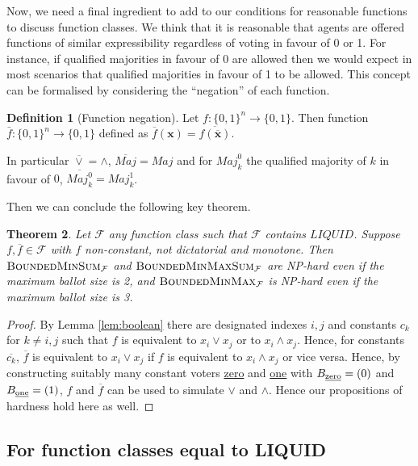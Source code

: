 \documentclass[11pt,a4paper, titlepage]{article}
\newtheorem{theorem}{Theorem}[section]
\theoremstyle{definition}
\newtheorem{definition}[theorem]{Definition}
\let\vec\mathbf
\newcommand{\BMM}{\textsc{BoundedMinMax}}
\newcommand{\BMS}{\textsc{BoundedMinSum}}
\newcommand{\BMMS}{\textsc{BoundedMinMaxSum}}
\newcommand{\Maj}{\mathit{Maj}}
\newcommand{\LIQUID}{\mathit{LIQUID}}
\begin{document}
Now, we need a final ingredient to add to our conditions for reasonable functions to discuss function classes.
We think that it is reasonable that agents are offered functions of similar expressibility regardless of voting in favour of 0 or 1.
For instance, if qualified majorities in favour of 0 are allowed then we would expect in most scenarios that qualified majorities in favour of 1 to be allowed.
This concept can be formalised by considering the ``negation'' of each function.

\begin{definition}[Function negation]
    Let $f \colon \{0, 1\}^n \longrightarrow \{0, 1\}$. Then function $\bar{f} \colon \{0, 1\}^n \longrightarrow \{0, 1\}$ defined as $\overline{f}(\vec{x}) = \overline{f(\overline{\vec{x}})}$.
\end{definition}

In particular $\overline{\lor} = \land$, $\overline{\Maj} = \Maj$ and for $\Maj_k^0$ the qualified majority of $k$ in favour of $0$, $\overline{\Maj_k^0} = \Maj_k^1$.

Then we can conclude the following key theorem.

\begin{theorem}
    Let $\mathcal{F}$ any function class such that $\mathcal{F}$ contains $\LIQUID$. Suppose $f, \overline{f} \in \mathcal{F}$ with $f$ non-constant, not dictatorial and monotone.
    Then $\BMS_\mathcal{F}$ and $\BMMS_\mathcal{F}$ are NP-hard even if the maximum ballot size is 2, and $\BMM_{\mathcal{F}}$ is NP-hard even if the maximum ballot size is 3.
\end{theorem}

\begin{proof}
    By Lemma \ref{lem:boolean} there are designated indexes $i, j$ and constants $c_k$ for $k \neq i, j$ such that $f$ is equivalent to $x_i \lor x_j$ or to $x_i \land x_j$.
    Hence, for constants $\overline{c_k}$, $\overline{f}$ is equivalent to $x_i \lor x_j$ if $f$ is equivalent to $x_i \land x_j$ or vice versa.
    Hence, by constructing suitably many constant voters \underline{zero} and \underline{one} with $B_{\text{\underline{zero}}} = (0)$ and $B_{\text{\underline{one}}} = (1)$, $f$ and $\overline{f}$ can be used to simulate $\lor$ and $\land$.
    Hence our propositions of hardness hold here as well.
\end{proof}

\subsection{For function classes equal to LIQUID}
\end{document}
